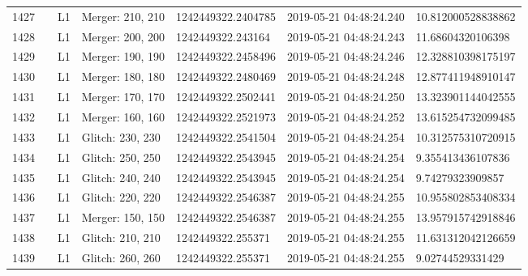 \begin{longtable}{lllllll}
1427 &                                                    &       L1 &  Merger: 210, 210 &  1242449322.2404785 &  2019-05-21 04:48:24.240 &  10.812000528838862 \\
1428 &                                                    &       L1 &  Merger: 200, 200 &   1242449322.243164 &  2019-05-21 04:48:24.243 &   11.68604320106398 \\
1429 &                                                    &       L1 &  Merger: 190, 190 &  1242449322.2458496 &  2019-05-21 04:48:24.246 &  12.328810398175197 \\
1430 &                                                    &       L1 &  Merger: 180, 180 &  1242449322.2480469 &  2019-05-21 04:48:24.248 &  12.877411948910147 \\
1431 &                                                    &       L1 &  Merger: 170, 170 &  1242449322.2502441 &  2019-05-21 04:48:24.250 &  13.323901144042555 \\
1432 &                                                    &       L1 &  Merger: 160, 160 &  1242449322.2521973 &  2019-05-21 04:48:24.252 &  13.615254732099485 \\
1433 &                                                    &       L1 &  Glitch: 230, 230 &  1242449322.2541504 &  2019-05-21 04:48:24.254 &  10.312575310720915 \\
1434 &                                                    &       L1 &  Glitch: 250, 250 &  1242449322.2543945 &  2019-05-21 04:48:24.254 &   9.355413436107836 \\
1435 &                                                    &       L1 &  Glitch: 240, 240 &  1242449322.2543945 &  2019-05-21 04:48:24.254 &    9.74279323909857 \\
1436 &                                                    &       L1 &  Glitch: 220, 220 &  1242449322.2546387 &  2019-05-21 04:48:24.255 &  10.955802853408334 \\
1437 &                                                    &       L1 &  Merger: 150, 150 &  1242449322.2546387 &  2019-05-21 04:48:24.255 &  13.957915742918846 \\
1438 &                                                    &       L1 &  Glitch: 210, 210 &   1242449322.255371 &  2019-05-21 04:48:24.255 &  11.631312042126659 \\
1439 &                                                    &       L1 &  Glitch: 260, 260 &   1242449322.255371 &  2019-05-21 04:48:24.255 &    9.02744529331429 \\

\end{longtable}
